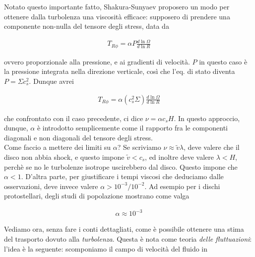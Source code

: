 \documentclass{report}
\begin{document}

Notato questo importante fatto, Shakura-Sunyaev proposero un modo per ottenere dalla turbolenza una viscosità efficace: supposero di prendere una componente non-nulla del tensore degli stress, data da 

\begin{align}
    T_{R\phi} = \alpha P \frac{d\ln\Omega}{d\ln R}
\end{align}

ovvero proporzionale alla pressione, e ai gradienti di velocità. \(P\) in questo caso è la pressione integrata nella direzione verticale, così che l'eq. di stato diventa \(P = \Sigma c_s^2\). Dunque avrei 

\begin{align}
    T_{R\phi} = \alpha (c_s^2 \Sigma)\frac{d\ln \Omega}{d\ln R}
\end{align}

che confrontato con il caso precedente, ci dice \(\nu = \alpha c_s H\). In questo approccio, dunque, \(\alpha\) è introdotto semplicemente come il rapporto fra le componenti diagonali e non diagonali del tensore degli stress. \\

Come faccio a mettere dei limiti su \(\alpha\)? Se scriviamo \(\nu \approx \tilde{v}\lambda\), deve valere che il disco non abbia shock, e questo impone \(\tilde{v} < c_s\), ed inoltre deve valere \(\lambda < H\), perchè se no le turbolenze isotrope uscirebbero dal disco. Questo impone che \(\alpha <1\). D'altra parte, per giustificare i tempi viscosi che deduciamo dalle osservazioni, deve invece valere \(\alpha > 10^{-3}/10^{-2}\). Ad esempio per i dischi protostellari, degli studi di popolazione mostrano come valga 

\begin{align}
    \alpha \approx 10^{-3}
\end{align}

Vediamo ora, senza fare i conti dettagliati, come è possibile ottenere una stima del trasporto dovuto alla \emph{turbolenza}. Questa è nota come teoria \emph{delle fluttuazioni}: l'idea è la seguente: scomponiamo il campo di velocità del fluido in 
\end{document}
